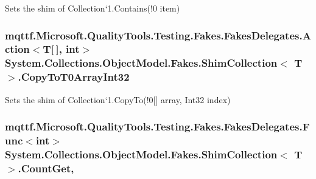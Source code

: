 Sets the shim of Collection`1.Contains(!0 item)

\hypertarget{class_system_1_1_collections_1_1_object_model_1_1_fakes_1_1_shim_collection_3_01_t_01_4_a866159f17334258c3f239ff47af566b3}{
\subsubsection[{Copy\-To\-T0\-Array\-Int32}]{\setlength{\rightskip}{0pt plus 5cm}mqttf.\-Microsoft.\-Quality\-Tools.\-Testing.\-Fakes.\-Fakes\-Delegates.\-Action$<$T\mbox{[}$\,$\mbox{]}, int$>$ System.\-Collections.\-Object\-Model.\-Fakes.\-Shim\-Collection$<$ T $>$.Copy\-To\-T0\-Array\-Int32\hspace{0.3cm}{\ttfamily [set]}}}\label{class_system_1_1_collections_1_1_object_model_1_1_fakes_1_1_shim_collection_3_01_t_01_4_a866159f17334258c3f239ff47af566b3}


Sets the shim of Collection`1.Copy\-To(!0\mbox{[}\mbox{]} array, Int32 index)

\hypertarget{class_system_1_1_collections_1_1_object_model_1_1_fakes_1_1_shim_collection_3_01_t_01_4_a2bc8ea3552d6427d282d74d7c80eba87}{
\subsubsection[{Count\-Get}]{\setlength{\rightskip}{0pt plus 5cm}mqttf.\-Microsoft.\-Quality\-Tools.\-Testing.\-Fakes.\-Fakes\-Delegates.\-Func$<$int$>$ System.\-Collections.\-Object\-Model.\-Fakes.\-Shim\-Collection$<$ T $>$.Count\-Get\hspace{0.3cm}{\ttfamily [get]}, {\ttfamily [set]}}}\label{class_system_1_1_collections_1_1_object_model_1_1_fakes_1_1_shim_collection_3_01_t_01_4_a2bc8ea3552d6427d282d74d7c80eba87}


